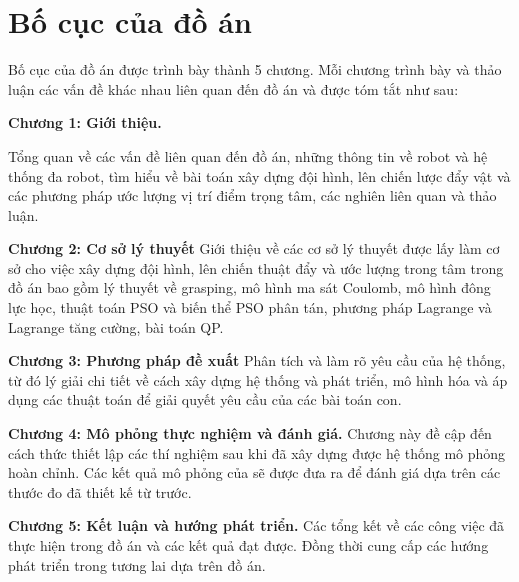 \section{Bố cục của đồ án}

Bố cục của đồ án được trình bày thành 5 chương. Mỗi chương trình bày và thảo luận các vấn đề khác nhau liên quan đến đồ án và được tóm tắt như sau:

\textbf{Chương 1: Giới thiệu.} 

Tổng quan về các vấn đề liên quan đến đồ án, những thông tin về robot và hệ thống đa robot, tìm hiểu về bài toán xây dựng đội hình, lên chiến lược đẩy vật và các phương pháp ước lượng vị trí điểm trọng tâm, các nghiên liên quan và thảo luận.



\textbf{Chương 2:  Cơ sở lý thuyết} 
Giới thiệu về các cơ sở lý thuyết được lấy làm cơ sở cho việc xây dựng đội hình, lên chiến thuật đẩy và ước lượng trong tâm trong đồ án bao gồm lý thuyết về grasping, mô hình ma sát Coulomb, mô hình đông lực học, thuật toán PSO và biến thể PSO phân tán, phương pháp Lagrange và Lagrange tăng cường, bài toán QP.   

\textbf{Chương 3:  Phương pháp đề xuất} 
Phân tích và làm rõ yêu cầu của hệ thống, từ đó lý giải chi tiết về cách xây dựng hệ thống và phát triển, mô hình hóa và áp dụng các thuật toán để giải quyết yêu cầu của các bài toán con.

\textbf{Chương 4: Mô phỏng thực nghiệm và đánh giá.} 
Chương này đề cập đến cách thức thiết lập các thí nghiệm sau khi đã xây dựng được hệ thống mô phỏng hoàn chỉnh. Các kết quả mô phỏng của sẽ được đưa ra để đánh giá dựa trên các thước đo đã thiết kế từ trước.

\textbf{Chương 5: Kết luận và hướng phát triển.} 
Các tổng kết về các công việc đã thực hiện trong đồ án và các kết quả đạt được. Đồng thời cung cấp các hướng phát triển trong tương lai dựa trên đồ án.